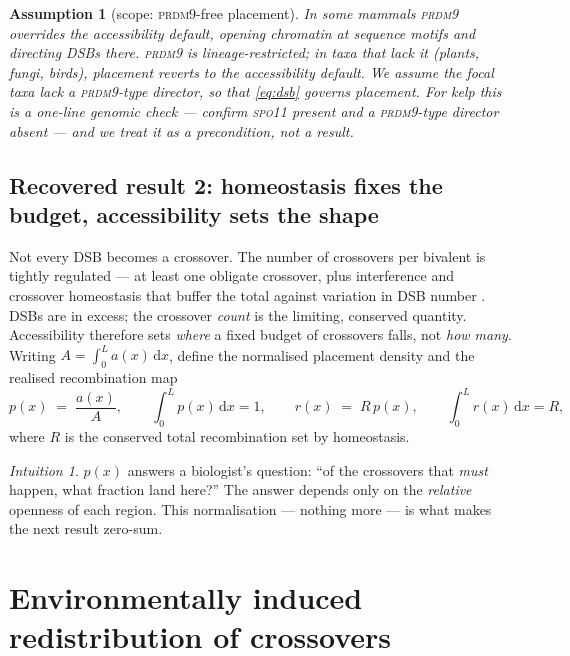 \documentclass[11pt]{article}
\newtheorem{assumption}{Assumption}
\theoremstyle{remark}
\newtheorem*{remark}{Intuition}
\newcommand{\dd}{\,\mathrm{d}}
\begin{document}
\begin{assumption}[scope: \textsc{prdm9}-free placement]\label{a:prdm9}
In some mammals \textsc{prdm9} overrides the accessibility default, opening
chromatin at sequence motifs and directing DSBs there. \textsc{prdm9} is
lineage-restricted; in taxa that lack it (plants, fungi, birds), placement
reverts to the accessibility default. We assume the focal taxa lack a
\textsc{prdm9}-type director, so that \eqref{eq:dsb} governs placement. For kelp
this is a one-line genomic check --- confirm \textsc{spo11} present and a
\textsc{prdm9}-type director absent --- and we treat it as a precondition, not a
result.
\end{assumption}

\subsection{Recovered result 2: homeostasis fixes the budget, accessibility sets the shape}

Not every DSB becomes a crossover. The number of crossovers per bivalent is
tightly regulated --- at least one obligate crossover, plus interference and
crossover homeostasis that buffer the total against variation in DSB number
\citep{martini2006}. DSBs are in excess; the crossover \emph{count} is the
limiting, conserved quantity. Accessibility therefore sets \emph{where} a fixed
budget of crossovers falls, not \emph{how many}. Writing $A=\int_0^L a(x)\dd x$,
define the normalised placement density and the realised recombination map
\begin{equation}
p(x) \;=\; \frac{a(x)}{A}, \qquad \int_0^L p(x)\dd x = 1, \qquad
r(x) \;=\; R\,p(x), \qquad \int_0^L r(x)\dd x = R,
\label{eq:placement}
\end{equation}
where $R$ is the conserved total recombination set by homeostasis.

\begin{remark}
$p(x)$ answers a biologist's question: ``of the crossovers that \emph{must}
happen, what fraction land here?'' The answer depends only on the \emph{relative}
openness of each region. This normalisation --- nothing more --- is what makes the
next result zero-sum.
\end{remark}

\section{Environmentally induced redistribution of crossovers}
\label{sec:redistribution}
\end{document}
